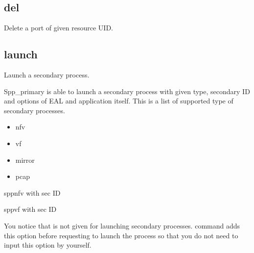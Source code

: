\documentclass[a4paper,11pt,openany,oneside,english]{sphinxmanual}
\begin{document}
\subsection{del}
\label{\detokenize{commands/primary:del}}\label{\detokenize{commands/primary:commands-primary-del}}
Delete a port of given resource UID.

\begin{sphinxVerbatim}[commandchars=\\\{\},formatcom=\footnotesize]
\end{sphinxVerbatim}


\subsection{launch}
\label{\detokenize{commands/primary:launch}}\label{\detokenize{commands/primary:commands-primary-launch}}
Launch a secondary process.

Spp\_primary is able to launch a secondary process with given type, secondary
ID and options of EAL and application itself. This is a list of supported type
of secondary processes.
\begin{itemize}
\item {} 
nfv

\item {} 
vf

\item {} 
mirror

\item {} 
pcap

\end{itemize}

\begin{sphinxVerbatim}[commandchars=\\\{\},formatcom=\footnotesize]
 spp\PYGZus{}nfv with sec ID 

 spp\PYGZus{}vf with sec ID 
\end{sphinxVerbatim}

You notice that  is not given for launching secondary
processes.  command adds this option before requesting to launch
the process so that you do not need to input this option by yourself.
\end{document}

